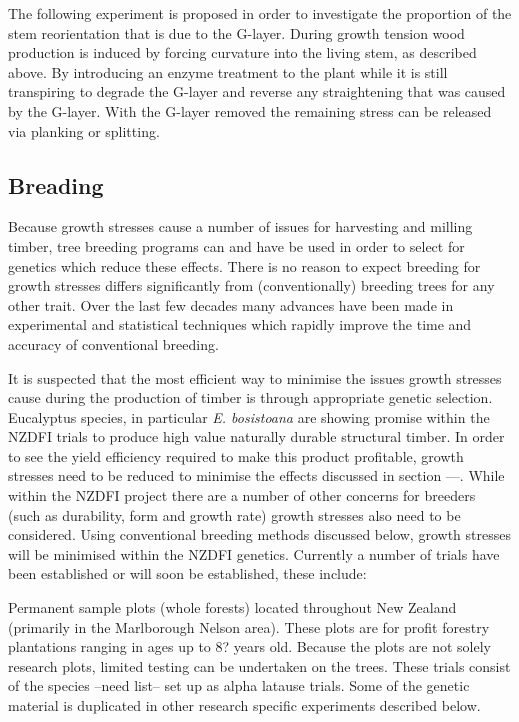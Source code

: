 \documentclass{article}
\begin{document}
The following experiment is proposed in order to investigate the proportion of
the stem reorientation that is due to the G-layer. During growth tension wood
production is induced by forcing curvature into the living stem, as described
above. By introducing an enzyme treatment to the plant while it is still
transpiring to degrade the G-layer and reverse any straightening that was caused
by the G-layer. With the G-layer removed the remaining stress can be released
via planking or splitting.

\subsection{Breading}
Because growth stresses cause a number of issues for harvesting and milling
timber, tree breeding programs can and have be used in order to select for
genetics which reduce these effects. There is no reason to expect  breeding for
growth stresses differs significantly from (conventionally) breeding trees for
any other trait. Over the last few decades many advances have been made in
experimental and statistical techniques which rapidly improve the time and
accuracy of conventional breeding.

It is suspected that the most efficient way to minimise the issues growth
stresses cause during the production of timber is through appropriate genetic
selection. Eucalyptus species, in particular \textit{E. bosistoana} are showing promise
within the NZDFI trials to produce high value naturally durable structural
timber. In order to see the yield efficiency required to make this product
profitable, growth stresses need to be reduced to minimise the effects discussed
in section ---. While within the NZDFI project there are a number of other
concerns for breeders (such as durability, form and growth rate) growth stresses
also need to be considered. Using conventional breeding methods discussed below,
growth stresses will be minimised within the NZDFI genetics. Currently a number
of trials have been established or will soon be established, these include:

Permanent sample plots (whole forests) located throughout New Zealand (primarily
in the Marlborough Nelson area). These plots are for profit forestry plantations
ranging in ages up to 8? years old. Because the plots are not solely research
plots, limited testing can  be undertaken on the trees. These trials consist of
the species --need list-- set up as alpha latause trials. Some of the genetic
material is duplicated in other research specific experiments described below.
\end{document}
